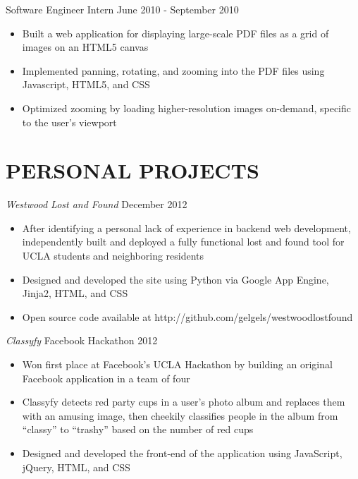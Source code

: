 \documentclass{res}
\begin{document}
\begin{resume}
 Software Engineer Intern \hfill    June 2010 - September 2010

   \begin{itemize} \itemsep -2pt
   \item Built a web application for displaying large-scale PDF files as a grid of images on an HTML5 canvas
   \item Implemented panning, rotating, and zooming into the PDF files using Javascript, HTML5, and CSS
	\item Optimized zooming by loading higher-resolution images on-demand, specific to the user's viewport
   \end{itemize} \vspace{-6pt}

\section{PERSONAL PROJECTS}
\vspace{6pt}

  {\sl Westwood Lost and Found } \hfill December 2012
  \begin{itemize} \itemsep -2pt
  \item{After identifying a personal lack of experience in backend web development, independently built and deployed a fully functional lost and found tool for UCLA students and neighboring residents}
  \item{Designed and developed the site using Python via Google App Engine, Jinja2, HTML, and CSS}
  \item{Open source code available at http://github.com/gelgels/westwoodlostfound}
  \end{itemize}\vspace{-6pt}



 {\sl Classyfy} \hfill Facebook Hackathon 2012
   \begin{itemize} \itemsep -2pt
   \item{Won first place at Facebook's UCLA Hackathon by building an original Facebook application in a team of four}
   \item Classyfy detects red party cups in a user's photo album and replaces them with an amusing image, then cheekily classifies people in the album from ``classy'' to ``trashy'' based on the number of red cups
    \item Designed and developed the front-end of the application using JavaScript, jQuery,  HTML, and CSS
    \end{itemize} \vspace{-6pt}


\end{resume}
\end{document}
